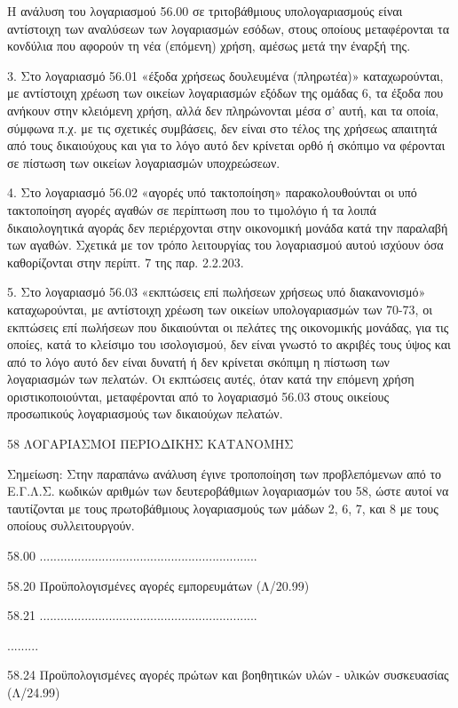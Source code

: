 \documentclass[A4,10pt,greek]{book}
\begin{document}
Η ανάλυση του λογαριασμού 56.00 σε τριτοβάθμιους υπολογαριασμούς είναι αντίστοιχη των αναλύσεων των λογαριασμών εσόδων, στους οποίους μεταφέρονται τα κονδύλια που αφορούν τη νέα (επόμενη) χρήση, αμέσως μετά την έναρξή της.

3. Στο λογαριασμό 56.01 «έξοδα χρήσεως δουλευμένα (πληρωτέα)» καταχωρούνται, με αντίστοιχη χρέωση των οικείων λογαριασμών εξόδων της ομάδας 6, τα έξοδα που ανήκουν στην κλειόμενη χρήση, αλλά δεν πληρώνονται μέσα σ' αυτή, και τα οποία, σύμφωνα π.χ. με τις σχετικές συμβάσεις, δεν είναι στο τέλος της χρήσεως απαιτητά από τους δικαιούχους και για το λόγο αυτό δεν κρίνεται ορθό ή σκόπιμο να φέρονται σε πίστωση των οικείων λογαριασμών υποχρεώσεων.

4. Στο λογαριασμό 56.02 «αγορές υπό τακτοποίηση» παρακολουθούνται οι υπό τακτοποίηση αγορές αγαθών σε περίπτωση που το τιμολόγιο ή τα λοιπά δικαιολογητικά αγοράς δεν περιέρχονται στην οικονομική μονάδα κατά την παραλαβή των αγαθών. Σχετικά με τον τρόπο λειτουργίας του λογαριασμού αυτού ισχύουν όσα καθορίζονται στην περίπτ. 7 της παρ. 2.2.203.

5. Στο λογαριασμό 56.03 «εκπτώσεις επί πωλήσεων χρήσεως υπό διακανονισμό» καταχωρούνται, με αντίστοιχη χρέωση των οικείων υπολογαριασμών των 70-73, οι εκπτώσεις επί πωλήσεων που δικαιούνται οι πελάτες της οικονομικής μονάδας, για τις οποίες, κατά το κλείσιμο του ισολογισμού, δεν είναι γνωστό το ακριβές τους ύψος και από το λόγο αυτό δεν είναι δυνατή ή δεν κρίνεται σκόπιμη η πίστωση των λογαριασμών των πελατών. Οι εκπτώσεις αυτές, όταν κατά την επόμενη χρήση οριστικοποιούνται, μεταφέρονται από το λογαριασμό 56.03 στους οικείους προσωπικούς λογαριασμούς των δικαιούχων πελατών.

 58   ΛΟΓΑΡΙΑΣΜΟΙ ΠΕΡΙΟΔΙΚΗΣ ΚΑΤΑΝΟΜΗΣ

       Σημείωση: Στην παραπάνω ανάλυση έγινε τροποποίηση των προβλεπόμενων
       από το Ε.Γ.Λ.Σ. κωδικών αριθμών των δευτεροβάθμιων λογαριασμών
       του 58, ώστε αυτοί να ταυτίζονται με τους πρωτοβάθμιους λογαριασμούς των
       μάδων 2, 6, 7, και 8 με τους οποίους συλλειτουργούν.

        58.00   ...............................................................

        58.20    Προϋπολογισμένες αγορές εμπορευμάτων (Λ/20.99)

        58.21    ...............................................................

        .........

        58.24   Προϋπολογισμένες αγορές πρώτων και βοηθητικών υλών - υλικών
                     συσκευασίας (Λ/24.99)
\end{document}
